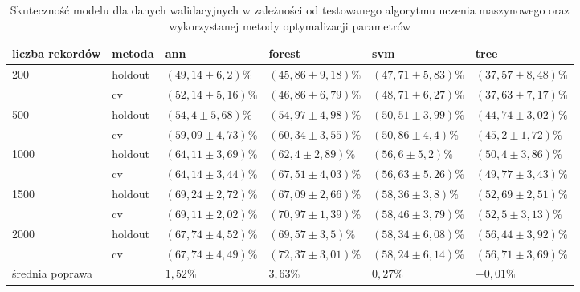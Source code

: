 \begin{table}[]
\centering
\begin{tabular}{|l|l|l|l|l|l|}
\hline
liczba rekordów       & metoda   & ann & forest & svm & tree \\ \hline
\multirow{2}{*}{200}     & holdout    & $ (49,14 \pm 6,2) \% $ & $(45,86 \pm 9,18) \% $ & $(47,71 \pm 5,83) \% $ & $(37,57 \pm 8,48) \% $ \\ \cline{2-6} 
                         & cv         & $(52,14 \pm 5,16) \% $ & $(46,86 \pm 6,79) \% $ & $(48,71 \pm 6,27) \% $ & $(37,63 \pm 7,17) \% $ \\ \hline
\multirow{2}{*}{500}     & holdout    & $(54,4 \pm 5,68) \% $ & $(54,97 \pm 4,98) \% $ & $(50,51 \pm 3,99) \% $ & $(44,74 \pm 3,02) \% $ \\ \cline{2-6} 
                         & cv         & $(59,09 \pm 4,73) \% $ & $(60,34 \pm 3,55) \% $ & $(50,86 \pm 4,4) \% $ & $(45,2 \pm 1,72) \% $ \\ \hline
\multirow{2}{*}{1000}    & holdout    & $(64,11 \pm 3,69) \% $ & $(62,4 \pm 2,89) \% $ & $(56,6 \pm 5,2) \% $ & $(50,4 \pm 3,86) \% $ \\ \cline{2-6} 
                         & cv         & $(64,14 \pm 3,44) \% $ & $(67,51 \pm 4,03) \% $ & $(56,63 \pm 5,26) \% $ & $(49,77 \pm 3,43) \% $ \\\hline
\multirow{2}{*}{1500}    & holdout    &$ (69,24 \pm 2,72) \% $ & $(67,09 \pm 2,66) \% $ & $(58,36 \pm 3,8) \% $ & $(52,69 \pm 2,51) \% $ \\ \cline{2-6} 
                         & cv         & $(69,11 \pm 2,02) \% $ & $(70,97 \pm 1,39) \% $ & $(58,46 \pm 3,79) \% $ & $(52,5 \pm 3,13) \% $ \\ \hline
\multirow{2}{*}{2000}    & holdout    & $(67,74 \pm 4,52) \% $ & $(69,57 \pm 3,5) \% $ & $(58,34 \pm 6,08) \% $ & $(56,44 \pm 3,92) \% $ \\ \cline{2-6} 
                                          & cv         & $(67,74 \pm 4,49) \% $ & $(72,37 \pm 3,01) \% $ & $(58,24 \pm 6,14) \% $ & $(56,71 \pm 3,69) \% $ \\ \hline
                                                                                    
\multicolumn{2}{|l|}{średnia poprawa}   &  $1,52 \%$    &  $3,63 \%$      &  $0,27 \%$   &  $-0,01 \%$   \\ \hline

\end{tabular}
\caption{Skuteczność modelu dla danych walidacyjnych w zależności od testowanego algorytmu uczenia maszynowego oraz wykorzystanej metody optymalizacji parametrów} \label{table:cv}
\end{table}

